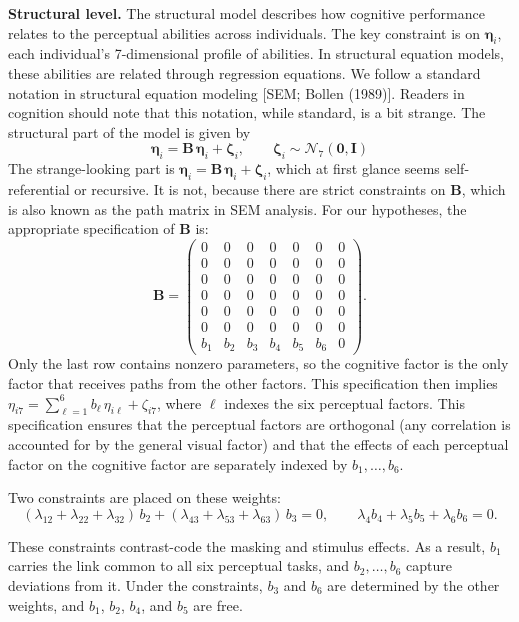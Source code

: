 \documentclass[
  ,man]{apa6}
\begin{document}
\textbf{Structural level.} The structural model describes how cognitive performance relates to the perceptual abilities across individuals. The key constraint is on \(\boldsymbol{\eta}_i\), each individual's 7-dimensional profile of abilities. In structural equation models, these abilities are related through regression equations. We follow a standard notation in structural equation modeling {[}SEM; Bollen (1989){]}. Readers in cognition should note that this notation, while standard, is a bit strange. The structural part of the model is given by \[\boldsymbol{\eta}_i = \mathbf{B}\,\boldsymbol{\eta}_i + \boldsymbol{\zeta}_i, \qquad
\boldsymbol{\zeta}_i \sim \mathcal{N}_{7}\!\left(\mathbf{0}, \mathbf{I}\right)\] The strange-looking part is \(\boldsymbol{\eta}_i = \mathbf{B}\,\boldsymbol{\eta}_i + \boldsymbol{\zeta}_i\), which at first glance seems self-referential or recursive. It is not, because there are strict constraints on \(\mathbf{B}\), which is also known as the path matrix in SEM analysis. For our hypotheses, the appropriate specification of \(\mathbf{B}\) is: \[\mathbf{B} =
\begin{pmatrix}
0 & 0 & 0 & 0 & 0 & 0 & 0\\
0 & 0 & 0 & 0 & 0 & 0 & 0\\
0 & 0 & 0 & 0 & 0 & 0 & 0\\
0 & 0 & 0 & 0 & 0 & 0 & 0\\
0 & 0 & 0 & 0 & 0 & 0 & 0\\
0 & 0 & 0 & 0 & 0 & 0 & 0\\
b_1 & b_2 & b_3 & b_4 & b_5 & b_6 & 0
\end{pmatrix}.\] Only the last row contains nonzero parameters, so the cognitive factor is the only factor that receives paths from the other factors. This specification then implies \(\eta_{i7} = \sum_{\ell=1}^{6} b_\ell\,\eta_{i\ell} + \zeta_{i7}\), where \(\ell\) indexes the six perceptual factors. This specification ensures that the perceptual factors are orthogonal (any correlation is accounted for by the general visual factor) and that the effects of each perceptual factor on the cognitive factor are separately indexed by \(b_1,\ldots,b_6\).

Two constraints are placed on these weights:
\[(\lambda_{12}+\lambda_{22}+\lambda_{32})\,b_2 + (\lambda_{43}+\lambda_{53}+\lambda_{63})\,b_3 = 0, \qquad \lambda_4 b_4 + \lambda_5 b_5 + \lambda_6 b_6 = 0.\]

These constraints contrast-code the masking and stimulus effects. As a result, \(b_1\) carries the link common to all six perceptual tasks, and \(b_2,\ldots,b_6\) capture deviations from it. Under the constraints, \(b_3\) and \(b_6\) are determined by the other weights, and \(b_1\), \(b_2\), \(b_4\), and \(b_5\) are free.
\end{document}
